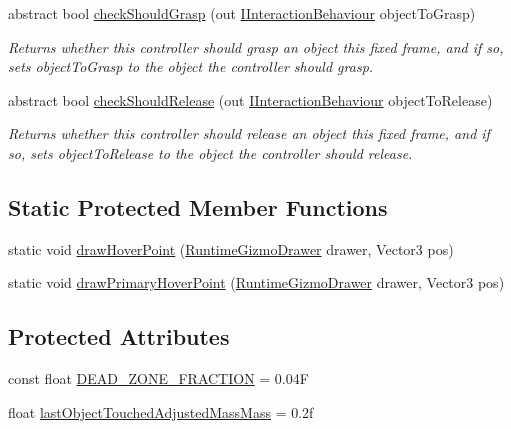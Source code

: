 \begin{DoxyCompactItemize}
abstract bool \mbox{\hyperlink{class_leap_1_1_unity_1_1_interaction_1_1_interaction_controller_a672d3a9313dbe37a693702024a61657d}{check\+Should\+Grasp}} (out \mbox{\hyperlink{interface_leap_1_1_unity_1_1_interaction_1_1_i_interaction_behaviour}{I\+Interaction\+Behaviour}} object\+To\+Grasp)
\begin{DoxyCompactList}\small\item\em Returns whether this controller should grasp an object this fixed frame, and if so, sets object\+To\+Grasp to the object the controller should grasp. \end{DoxyCompactList}\item 
abstract bool \mbox{\hyperlink{class_leap_1_1_unity_1_1_interaction_1_1_interaction_controller_ac2f99423db66dad0d889723c6acff62f}{check\+Should\+Release}} (out \mbox{\hyperlink{interface_leap_1_1_unity_1_1_interaction_1_1_i_interaction_behaviour}{I\+Interaction\+Behaviour}} object\+To\+Release)
\begin{DoxyCompactList}\small\item\em Returns whether this controller should release an object this fixed frame, and if so, sets object\+To\+Release to the object the controller should release. \end{DoxyCompactList}\end{DoxyCompactItemize}
\subsection*{Static Protected Member Functions}
\begin{DoxyCompactItemize}
\item 
static void \mbox{\hyperlink{class_leap_1_1_unity_1_1_interaction_1_1_interaction_controller_a91d025406da30ca80629fd01898b6935}{draw\+Hover\+Point}} (\mbox{\hyperlink{class_leap_1_1_unity_1_1_runtime_gizmos_1_1_runtime_gizmo_drawer}{Runtime\+Gizmo\+Drawer}} drawer, Vector3 pos)
\item 
static void \mbox{\hyperlink{class_leap_1_1_unity_1_1_interaction_1_1_interaction_controller_abab3a785a24c9d0d028ca7757d7aa657}{draw\+Primary\+Hover\+Point}} (\mbox{\hyperlink{class_leap_1_1_unity_1_1_runtime_gizmos_1_1_runtime_gizmo_drawer}{Runtime\+Gizmo\+Drawer}} drawer, Vector3 pos)
\end{DoxyCompactItemize}
\subsection*{Protected Attributes}
\begin{DoxyCompactItemize}
\item 
const float \mbox{\hyperlink{class_leap_1_1_unity_1_1_interaction_1_1_interaction_controller_a11c7de0dc654832053eb8cdd2ab6bce8}{D\+E\+A\+D\+\_\+\+Z\+O\+N\+E\+\_\+\+F\+R\+A\+C\+T\+I\+ON}} = 0.\+04F
\item 
float \mbox{\hyperlink{class_leap_1_1_unity_1_1_interaction_1_1_interaction_controller_a2a4bd7c1286aac2da300fd0d93273b28}{last\+Object\+Touched\+Adjusted\+Mass\+Mass}} = 0.\+2f
\end{DoxyCompactItemize}
